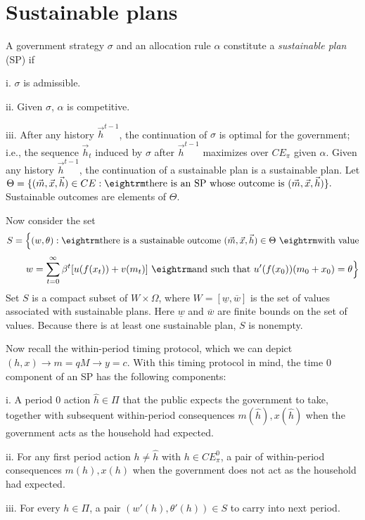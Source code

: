 \section{Sustainable plans}\label{sec:sustainabilityD}%
 A government strategy $\sigma$ and an allocation rule $\alpha$  constitute a {\it sustainable plan\/} (SP)
if
\item{i.} $\sigma$ is admissible.
\item{ii.}  Given $\sigma$, $\alpha$ is competitive.
\item{iii.} After any history $\vec h^{t-1}$, the continuation of $\sigma$ is optimal for the government; i.e., the  sequence
$\vec h_t$ induced by $\sigma$ after $\vec h^{t-1}$ maximizes  over $CE_\pi$ given $\alpha$.
\medskip
{} Given any history $\vec h^{t-1}$, the continuation of a sustainable plan is a sustainable plan.
\medskip
{} Let $\Theta = \{ (\vec m, \vec x, \vec h) \in CE : {\rm there \ is \ an \  SP \ whose \ outcome \ is } \ (\vec m, \vec x, \vec h) \}.$
\medskip
\medskip \noindent Sustainable outcomes are elements of $\Theta$.

Now consider the set
$$ S = \Bigl\{ (w,\theta) : {\rm there \ is \ a \ sustainable \ outcome } \ (\vec m, \vec x, \vec h) \in \Theta  \ {\rm with \ value} $$
$$ \ \ \ \ \ \  w= \sum_{t=0}^\infty \beta^t [u(f(x_t)) + v(m_t)]  \ {\rm and \ such \ that } \ u'(f(x_0)) (m_0 + x_0) = \theta \Bigr\} $$
Set $S$ is a compact subset of $W \times \Omega$, where $W = [\underline w, \overline w]$ is the set of values associated with
sustainable plans.  Here $\underline w$ and $\overline w$ are finite bounds on the set of values. Because there is at least one sustainable plan, $S$ is nonempty.

Now recall the within-period timing protocol, which we can depict $(h,x) \rightarrow m=q M \rightarrow y = c$.
With this timing protocol in mind, the time $0$ component of an SP has the following components:

 \medskip

\item{i.} A period $0$ action $\hat h \in \Pi$ that the public expects the government to take, together with subsequent within-period consequences
$m(\hat h), x(\hat h)$ when the government  acts as the household had expected.
\item{ii.} For any first period action $h \neq \hat h$ with $h \in CE_\pi^0$, a pair of within-period  consequences $m(h), x(h)$ when the government does not act
as the household had expected.
\item{iii.} For every $h \in \Pi$, a pair $(w'(h), \theta'(h))\in S$ to carry into next period.

